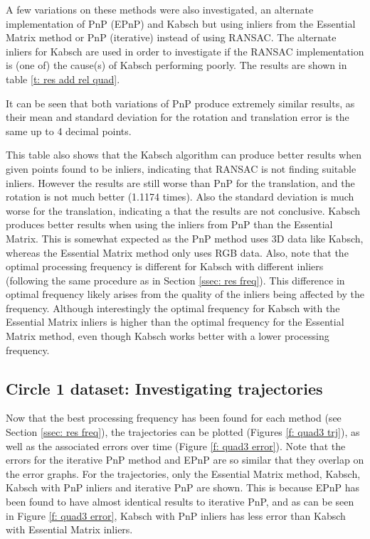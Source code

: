\documentclass[12pt,a4paper]{article}
\begin{document}
    A few variations on these methods were also investigated, an alternate implementation of PnP (EPnP) and Kabsch but using inliers from the Essential Matrix method or PnP (iterative) instead of using RANSAC. The alternate inliers for Kabsch are used in order to investigate if the RANSAC implementation is (one of) the cause(s) of Kabsch performing poorly. The results are shown in table \ref{t: res add rel quad}. 
     
    It can be seen that both variations of PnP produce extremely similar results, as their mean and standard deviation for the rotation and translation error is the same up to 4 decimal points. 
     
    This table also shows that the Kabsch algorithm can produce better results when given points found to be inliers, indicating that RANSAC is not finding suitable inliers. However the results are still worse than PnP for the translation, and the rotation is not much better (1.1174 times). Also the standard deviation is much worse for the translation, indicating a that the results are not conclusive. Kabsch produces better results when using the inliers from PnP than the Essential Matrix. This is somewhat expected as the PnP method uses 3D data like Kabsch, whereas the Essential Matrix method only uses RGB data. Also, note that the optimal processing frequency is different for Kabsch with different inliers (following the same procedure as in Section \ref{ssec: res freq}). This difference in optimal frequency likely arises from the quality of the inliers being affected by the frequency. Although interestingly the optimal frequency for Kabsch with the Essential Matrix inliers is higher than the optimal frequency for the Essential Matrix method, even though Kabsch works better with a lower processing frequency. 


  \subsection{Circle 1 dataset: Investigating trajectories}
  \label{ssec: res trj}
    Now that the best processing frequency has been found for each method (see Section \ref{ssec: res freq}), the trajectories can be plotted (Figures \ref{f: quad3 trj}), as well as the associated errors over time (Figure \ref{f: quad3 error}). Note that the errors for the iterative PnP method and EPnP are so similar that they overlap on the error graphs. For the trajectories, only the Essential Matrix method, Kabsch, Kabsch with PnP inliers and iterative PnP are shown. This is because EPnP has been found to have almost identical results to iterative PnP, and as can be seen in Figure \ref{f: quad3 error}, Kabsch with PnP inliers has less error than Kabsch with Essential Matrix inliers. 
\end{document}
